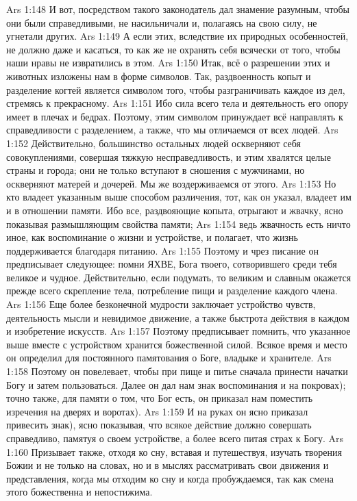 \vs Ars 1:148
И вот, посредством такого законодатель дал знамение разумным, чтобы они были справедливыми, не насильничали и, полагаясь на свою силу, не угнетали других.
\vs Ars 1:149
А если этих, вследствие их природных особенностей, не должно даже и касаться, то как же не охранять себя всячески от того, чтобы наши нравы не извратились в этом.
\vs Ars 1:150
Итак, всё о разрешении этих и животных изложены нам в форме символов. Так, раздвоенность копыт и разделение когтей является символом того, чтобы разграничивать каждое из дел, стремясь к прекрасному.
\vs Ars 1:151
Ибо сила всего тела и деятельность его опору имеет в плечах и бедрах. Поэтому, этим символом принуждает всё направлять к справедливости с разделением, а также, что мы отличаемся от всех людей.
\vs Ars 1:152
Действительно, большинство остальных людей оскверняют себя совокуплениями, совершая тяжкую несправедливость, и этим хвалятся целые страны и города; они не только вступают в сношения с мужчинами, но оскверняют матерей и дочерей. Мы же воздерживаемся от этого.
\vs Ars 1:153
Но кто владеет указанным выше способом различения, тот, как он указал, владеет им и в отношении памяти. Ибо все, раздвояющие копыта, отрыгают и жвачку, ясно показывая размышляющим свойства памяти;
\vs Ars 1:154
ведь жвачность есть ничто иное, как воспоминание о жизни и устройстве, и полагает, что жизнь поддерживается благодаря питанию.
\vs Ars 1:155
Поэтому и чрез писание он предписывает следующее: помни ЯХВЕ, Бога твоего, сотворившего среди тебя великое и чудное. Действительно, если подумать, то великим и славным окажется прежде всего скрепление тела, потребление пищи и разделение каждого члена.
\vs Ars 1:156
Еще более безконечной мудрости заключает устройство чувств, деятельность мысли и невидимое движение, а также быстрота действия в каждом и изобретение искусств.
\vs Ars 1:157
Поэтому предписывает помнить, что указанное выше вместе с устройством хранится божественной силой. Всякое время и место он определил для постоянного памятования о Боге, владыке и хранителе.
\vs Ars 1:158
Поэтому он повелевает, чтобы при пище и питье сначала принести начатки Богу и затем пользоваться. Далее он дал нам знак воспоминания и на покровах); точно также, для памяти о том, что Бог есть, он приказал нам поместить изречения на дверях и воротах).
\vs Ars 1:159
И на руках он ясно приказал привесить знак), ясно показывая, что всякое действие должно совершать справедливо, памятуя о своем устройстве, а более всего питая страх к Богу.
\vs Ars 1:160
Призывает также, отходя ко сну, вставая и путешествуя, изучать творения Божии и не только на словах, но и в мыслях рассматривать свои движения и представления, когда мы отходим ко сну и когда пробуждаемся, так как смена этого божественна и непостижима.
